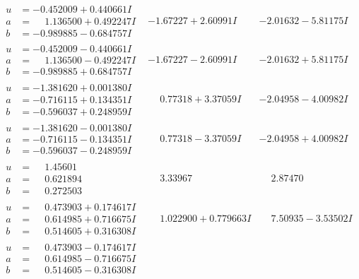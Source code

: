 \documentclass[1p]{elsarticle_modified}
\theoremstyle{definition}
\begin{document}
$$\begin{array}{c|c|c}
\begin{aligned}
u &= -0.452009 + 0.440661 I \\
a &= \phantom{-}1.136500 + 0.492247 I \\
b &= -0.989885 - 0.684757 I\end{aligned}
 & -1.67227 + 2.60991 I & -2.01632 - 5.81175 I \\ \hline\begin{aligned}
u &= -0.452009 - 0.440661 I \\
a &= \phantom{-}1.136500 - 0.492247 I \\
b &= -0.989885 + 0.684757 I\end{aligned}
 & -1.67227 - 2.60991 I & -2.01632 + 5.81175 I \\ \hline\begin{aligned}
u &= -1.381620 + 0.001380 I \\
a &= -0.716115 + 0.134351 I \\
b &= -0.596037 + 0.248959 I\end{aligned}
 & \phantom{-}0.77318 + 3.37059 I & -2.04958 - 4.00982 I \\ \hline\begin{aligned}
u &= -1.381620 - 0.001380 I \\
a &= -0.716115 - 0.134351 I \\
b &= -0.596037 - 0.248959 I\end{aligned}
 & \phantom{-}0.77318 - 3.37059 I & -2.04958 + 4.00982 I \\ \hline\begin{aligned}
u &= \phantom{-}1.45601\phantom{ +0.000000I} \\
a &= \phantom{-}0.621894\phantom{ +0.000000I} \\
b &= \phantom{-}0.272503\phantom{ +0.000000I}\end{aligned}
 & \phantom{-}3.33967\phantom{ +0.000000I} & \phantom{-}2.87470\phantom{ +0.000000I} \\ \hline\begin{aligned}
u &= \phantom{-}0.473903 + 0.174617 I \\
a &= \phantom{-}0.614985 + 0.716675 I \\
b &= \phantom{-}0.514605 + 0.316308 I\end{aligned}
 & \phantom{-}1.022900 + 0.779663 I & \phantom{-}7.50935 - 3.53502 I \\ \hline\begin{aligned}
u &= \phantom{-}0.473903 - 0.174617 I \\
a &= \phantom{-}0.614985 - 0.716675 I \\
b &= \phantom{-}0.514605 - 0.316308 I\end{aligned}

\end{array}$$
\end{document}
